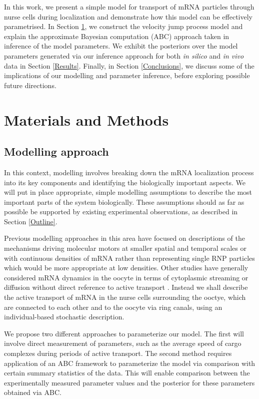 \documentclass[twocolumn]{biophys}
\begin{document}
In this work, we present a simple model for transport of mRNA particles through nurse cells during localization and demonstrate how this model can be effectively parametrised.
In Section \ref{Methods}, we construct the velocity jump process model and explain the approximate Bayesian computation (ABC) approach taken in inference of the model parameters.
We exhibit the posteriors over the model parameters generated via our inference approach for both \textit{in silico} and \textit{in vivo} data in Section \ref{Results}.
Finally, in Section \ref{Conclusions}, we discuss some of the implications of our modelling and parameter inference, before exploring possible future directions.

\section{Materials and Methods} \label{Methods}
\subsection{Modelling approach} \label{Modelling}
In this context, modelling involves breaking down the mRNA localization process into its key components and identifying the biologically important aspects. 
We will put in place appropriate, simple modelling assumptions to describe the most important parts of the system biologically.
These assumptions should as far as possible be supported by existing experimental observations, as described in Section \ref{Outline}.

Previous modelling approaches in this area have focused on descriptions of the mechanisms driving molecular motors at smaller spatial and temporal scales \citep{bressloff2013stochastic} or with continuous densities of mRNA \citep{szymanska2014mathematical} rather than representing single RNP particles which would be more appropriate at low densities.
Other studies have generally considered mRNA dynamics in the oocyte in terms of cytoplasmic streaming or diffusion without direct reference to active transport \citep{ganguly2012cytoplasmic, liu2011role}.
Instead we shall describe the active transport of mRNA in the nurse cells surrounding the ooctye, which are connected to each other and to the oocyte via ring canals, using an individual-based stochastic description.

We propose two different approaches to parameterize our model. 
The first will involve direct measurement of parameters, such as the average speed of cargo complexes during periods of active transport.
The second method requires application of an ABC framework \citep{johnston2014interpreting, turner2012tutorial, beaumont2002approximate} to parameterize the model via comparison with certain summary statistics of the data.
This will enable comparison between the experimentally measured parameter values and the posterior for these parameters obtained via ABC.
\end{document}
